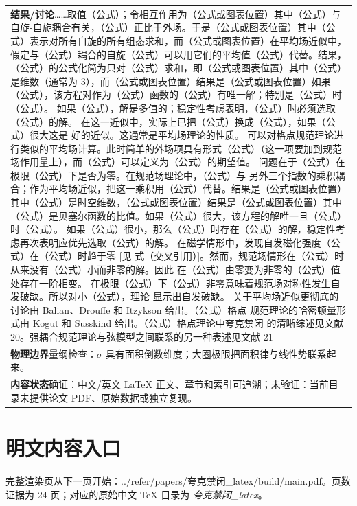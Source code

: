 \documentclass[UTF8,11pt,oneside]{ctexbook}
\begin{document}
\begin{table}[htbp]
\begin{tabular}{@{}p{}@{}}
    \textbf{结果/讨论}\quad ……取值（公式）；令相互作用为（公式或图表位置）其中（公式）与自旋-自旋耦合有关，（公式）正比于外场。于是（公式或图表位置）其中（公式）表示对所有自旋的所有组态求和，而（公式或图表位置）在平均场近似中，假定与（公式）耦合的自旋（公式）可以用它们的平均值（公式）代替。结果，（公式）的公式化简为只对（公式）求和，即（公式或图表位置）其中（公式）是维数（通常为 3），而（公式或图表位置）结果是（公式或图表位置）如果（公式），该方程对作为（公式）函数的（公式）有唯一解；特别是（公式）时（公式）。 如果（公式），解是多值的；稳定性考虑表明，（公式）时必须选取（公式）的解。 在这一近似中，实际上已把（公式）换成（公式），如果（公式）很大这是 好的近似。这通常是平均场理论的性质。 可以对格点规范理论进行类似的平均场计算。此时简单的外场项具有形式（公式）（这一项要加到规范场作用量上），而（公式）可以定义为（公式）的期望值。 问题在于（公式）在极限（公式）下是否为零。在规范场理论中，（公式）与 另外三个指数的乘积耦合；作为平均场近似，把这一乘积用（公式）代替。结果是（公式或图表位置）其中（公式）是时空维数，（公式或图表位置）结果是（公式或图表位置）其中（公式）是贝塞尔函数的比值。如果（公式）很大，该方程的解唯一且（公式）时（公式）。 如果（公式）很小，那么（公式）时存在（公式）的解，稳定性考虑再次表明应优先选取（公式）的解。 在磁学情形中，发现自发磁化强度（公式）在（公式）时趋于零 [见 式（交叉引用）]。然而，规范场情形在（公式）时从来没有（公式）小而非零的解。因此 在（公式）由零变为非零的（公式）值处存在一阶相变。 在极限（公式）下（公式）非零意味着规范场对称性发生自发破缺。所以对小（公式），理论 显示出自发破缺。 关于平均场近似更彻底的讨论由 Balian、Drouffe 和 Itzykson 给出。（公式）格点 规范理论的哈密顿量形式由 Kogut 和 Susskind 给出。（公式）格点理论中夸克禁闭 的清晰综述见文献 20。强耦合规范理论与弦模型之间联系的另一种表述见文献 21 \\
    \textbf{物理边界}\quad 量纲检查：$\sigma$ 具有面积倒数维度；大圈极限把面积律与线性势联系起来。 \\
    \textbf{内容状态}\quad 确证：中文/英文 LaTeX 正文、章节和索引可追溯；未验证：当前目录未提供论文 PDF、原始数据或独立复现。 \\
    \bottomrule
  \end{tabular}
\end{table}
\section*{明文内容入口}
\noindent 完整渲染页从下一页开始：../\allowbreak{}refer/\allowbreak{}papers/\allowbreak{}夸克禁闭\_\allowbreak{}latex/\allowbreak{}build/\allowbreak{}main.pdf。页数证据为 24 页；对应的原始中文 TeX 目录为 \emph{夸克禁闭\_latex}。
\clearpage

\clearpage
\end{document}
